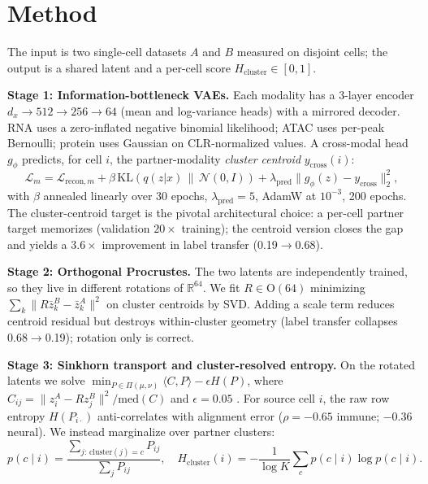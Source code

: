 \documentclass{article}
\theoremstyle{plain}
\newcommand{\Hcluster}{H_{\text{cluster}}}
\begin{document}
\section{Method}
\label{sec:methods}

The input is two single-cell datasets $A$ and $B$ measured on disjoint cells; the output is a shared latent and a per-cell score $\Hcluster\in[0,1]$.

\textbf{Stage 1: Information-bottleneck VAEs.} Each modality has a 3-layer encoder $d_x\to 512\to 256\to 64$ (mean and log-variance heads) with a mirrored decoder. RNA uses a zero-inflated negative binomial likelihood; ATAC uses per-peak Bernoulli; protein uses Gaussian on CLR-normalized values. A cross-modal head $g_\phi$ predicts, for cell $i$, the partner-modality \emph{cluster centroid} $y_{\text{cross}}(i)$:
\begin{equation}
\mathcal{L}_m = \mathcal{L}_{\text{recon},m} + \beta\,\mathrm{KL}\!\left(q(z|x)\,\|\,\mathcal{N}(0,I)\right) + \lambda_{\text{pred}}\|g_\phi(z) - y_{\text{cross}}\|_2^2,
\label{eq:ibvae}
\end{equation}
with $\beta$ annealed linearly over 30 epochs, $\lambda_{\text{pred}}=5$, AdamW at $10^{-3}$, 200 epochs. The cluster-centroid target is the pivotal architectural choice: a per-cell partner target memorizes (validation $20\times$ training); the centroid version closes the gap and yields a $3.6\times$ improvement in label transfer (0.19$\to$0.68).

\textbf{Stage 2: Orthogonal Procrustes.} The two latents are independently trained, so they live in different rotations of $\mathbb{R}^{64}$. We fit $R\in\mathrm{O}(64)$ minimizing $\sum_k\|R\bar{z}_k^B-\bar{z}_k^A\|^2$ on cluster centroids by SVD. Adding a scale term reduces centroid residual but destroys within-cluster geometry (label transfer collapses 0.68$\to$0.19); rotation only is correct.

\textbf{Stage 3: Sinkhorn transport and cluster-resolved entropy.} On the rotated latents we solve $\min_{P\in\Pi(\mu,\nu)}\langle C,P\rangle - \epsilon H(P)$, where $C_{ij}=\|z_i^A - Rz_j^B\|^2/\mathrm{med}(C)$ and $\epsilon=0.05$ \citep{flamary2021pot}. For source cell $i$, the raw row entropy $H(P_{i\cdot})$ anti-correlates with alignment error ($\rho=-0.65$ immune; $-0.36$ neural). We instead marginalize over partner clusters:
\begin{equation}
p(c\mid i) = \frac{\sum_{j:\,\text{cluster}(j)=c} P_{ij}}{\sum_j P_{ij}},\quad
\Hcluster(i) = -\frac{1}{\log K}\sum_c p(c\mid i)\log p(c\mid i).
\label{eq:hcluster}
\end{equation}
\end{document}
